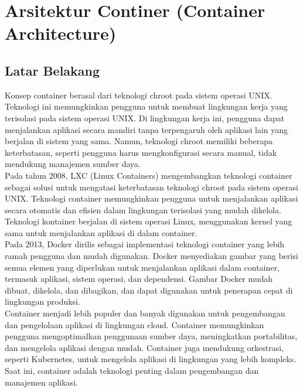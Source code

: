 \chapter{Arsitektur Continer (Container Architecture)}

\section{Latar Belakang}
Konsep container berasal dari teknologi chroot pada sistem operasi UNIX. Teknologi ini memungkinkan pengguna untuk membuat lingkungan kerja yang terisolasi pada sistem operasi UNIX. Di lingkungan kerja ini, pengguna dapat menjalankan aplikasi secara mandiri tanpa terpengaruh oleh aplikasi lain yang berjalan di sistem yang sama. Namun, teknologi chroot memiliki beberapa keterbatasan, seperti pengguna harus mengkonfigurasi secara manual, tidak mendukung manajemen sumber daya.\\
 
Pada tahun 2008, LXC (Linux Containers) mengembangkan teknologi container sebagai solusi untuk mengatasi keterbatasan teknologi chroot pada sistem operasi UNIX. Teknologi container memungkinkan pengguna untuk menjalankan aplikasi secara otomatis dan efisien dalam lingkungan terisolasi yang mudah dikelola. Teknologi kontainer berjalan di sistem operasi Linux, menggunakan kernel yang sama untuk menjalankan aplikasi di dalam container.\\

Pada 2013, Docker dirilis sebagai implementasi teknologi container yang lebih ramah pengguna dan mudah digunakan. Docker menyediakan gambar yang berisi semua elemen yang diperlukan untuk menjalankan aplikasi dalam container, termasuk aplikasi, sistem operasi, dan dependensi. Gambar Docker mudah dibuat, dikelola, dan dibagikan, dan dapat digunakan untuk penerapan cepat di lingkungan produksi.\\

Container menjadi lebih populer dan banyak digunakan untuk pengembangan dan pengelolaan aplikasi di lingkungan cloud. Container memungkinkan pengguna mengoptimalkan penggunaan sumber daya, meningkatkan portabilitas, dan mengelola aplikasi dengan mudah. Container juga mendukung orkestrasi, seperti Kubernetes, untuk mengelola aplikasi di lingkungan yang lebih kompleks. Saat ini, container adalah teknologi penting dalam pengembangan dan manajemen aplikasi.
